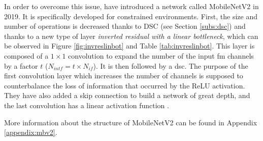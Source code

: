 In order to overcome this issue, \textcite{sandler_mobilenetv2_2019} have introduced a network called MobileNetV2 in 2019. It is specifically developed for constrained environments. First, the size and number of operations is decreased thanks to DSC (see Section \ref{subs:dsc}) and thanks to a new type of layer \textit{inverted residual with a linear bottleneck}, which can be observed in Figure \ref{fig:invreslinbot} and Table \ref{tab:invreslinbot}.
This layer is composed of a $1 \times 1$ convolution to expand the number of the input \acrshort{fm} channels by a factor $t$ ($N_{intf} = t \times N_{if}$). It is then followed by a \acrshort{dsc}. The purpose of the first convolution layer which increases the number of channels is supposed to counterbalance the loss of information that occurred by the ReLU activation. They have also added a skip connection to build a network of great depth, and the last convolution has a linear activation function \cite{sandler_mobilenetv2_2019}.

More information about the structure of MobileNetV2 can be found in Appendix \ref{appendix:mbv2}.
